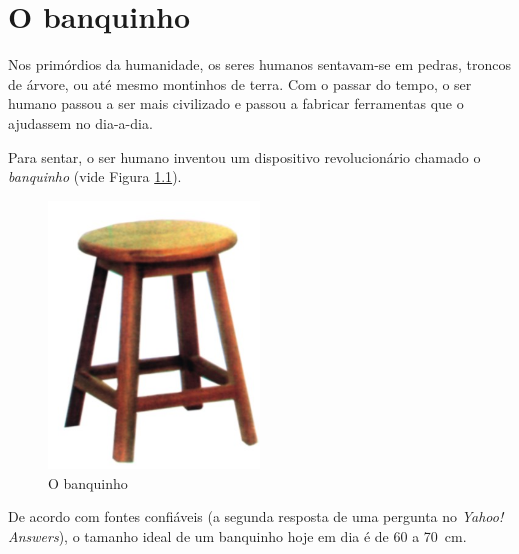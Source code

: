 \chapter{O banquinho}
\label{chap:banquinho}

Nos primórdios da humanidade, os seres humanos sentavam-se em
pedras, troncos de árvore, ou até mesmo montinhos de terra.
Com o passar do tempo, o ser humano passou a ser mais civilizado
e passou a fabricar ferramentas que o ajudassem no dia-a-dia.

Para sentar, o ser humano inventou um dispositivo revolucionário
chamado o \emph{banquinho} (vide Figura \ref{fig:banquinho}).

\begin{figure}[!htb]
  \centering
  \includegraphics[width=0.5\textwidth]{banquinho.jpg}
  \caption{O banquinho}
  \label{fig:banquinho}
\end{figure}

De acordo com fontes confiáveis (a segunda resposta de uma pergunta
no \textit{Yahoo! Answers}), o tamanho ideal de um banquinho hoje em
dia é de 60 a 70~cm.
